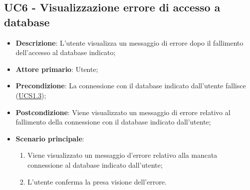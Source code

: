 \subsection{UC6 - Visualizzazione errore di accesso a database}
\label{sub:uc6}
\begin{itemize}
    \item \textbf{Descrizione}: L'utente visualizza un messaggio di errore dopo il fallimento dell'accesso
    al database indicato;

    \item \textbf{Attore primario}: Utente;
    
    \item \textbf{Precondizione}:   La connessione con il database indicato dall'utente fallisce 
    (\hyperref[ssub:ucs1.3]{UCS1.3});

    \item \textbf{Postcondizione}:  Viene visualizzato un messaggio di errore relativo al fallimento della connessione 
    con il database indicato dall'utente;

    \item \textbf{Scenario principale}:
    \begin{enumerate}
        \item Viene visualizzato un messaggio d'errore relativo alla mancata connessione al database indicato dall'utente;
        \item L'utente conferma la presa visione dell'errore.
    \end{enumerate}
\end{itemize}